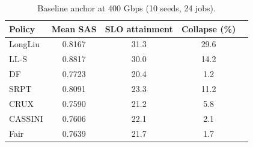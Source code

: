 \begin{table}[t]
\centering
\caption{Baseline anchor at 400 Gbps (10 seeds, 24 jobs).}
\label{tab:anchor}
\small\begin{tabular}{lcccc}\toprule
Policy & Mean SAS & SLO attainment & Collapse (\%) \\\midrule
LongLiu & 0.8167 & 31.3 & 29.6 \\
LL-S & 0.8817 & 30.0 & 14.2 \\
DF & 0.7723 & 20.4 & 1.2 \\
SRPT & 0.8091 & 23.3 & 11.2 \\
CRUX & 0.7590 & 21.2 & 5.8 \\
CASSINI & 0.7606 & 22.1 & 2.1 \\
Fair & 0.7639 & 21.7 & 1.7 \\
\bottomrule\end{tabular}\end{table}
